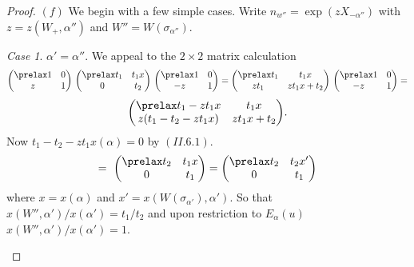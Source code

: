 \documentclass{memo-l}
\theoremstyle{definition}
\theoremstyle{remark}
\newtheorem{case}{Case}
\numberwithin{section}{chapter}
\numberwithin{equation}{chapter}
\begin{document}
\begin{proof}
   $(f)$ We begin with a few simple cases.  Write $n_{w''}  = 
\exp(zX_{-{\alpha}''})$ with $z = z(W_{+},{\alpha''})$ and $W''  = 
W({\sigma}_{{\alpha''}})$.
 

\begin{case} %
${\alpha}' = {\alpha''}$.  We appeal to the $2\times 2$ matrix
calculation
$$
{\begin{pmatrix} \prelax  1 & 0 \\ z & 1 \end{pmatrix}}\
{\begin{pmatrix} \prelax  
 t_1 & t_1x \\ 0 & t_2 \end{pmatrix}}\
{\begin{pmatrix} \prelax  
 1 & 0 \\ -z & 1 \end{pmatrix}}
=
{\begin{pmatrix} \prelax  
 t_1 & t_1x \\ zt_1 & zt_1x+t_2 \end{pmatrix}}\
{\begin{pmatrix} \prelax  
 1 & 0 \\ -z & 1 \end{pmatrix}} =
$$
$$
{\begin{pmatrix} \prelax  
 t_1-zt_1x & t_1x \\
z(t_1-t_2-zt_1x) & zt_1x+t_2 \end{pmatrix}} .
$$
Now $t_{1}-t_{2}-zt_{1}x({\alpha})  =  0$ by $(II.6.1)$.
$$
=\ {\begin{pmatrix} \prelax  
t_2 & t_1x \\ 0 & t_1 \end{pmatrix}} = 
{\begin{pmatrix} \prelax  
t_2 & t_2x' \\ 0 & t_1 \end{pmatrix}}
$$
where $x = x({\alpha})$ and $x'  = 
x(W({\sigma}_{{\alpha}'}),{\alpha}')$.  So that
$x(W'',{\alpha}')/x({\alpha}')  =  t_{1}/t_{2}$ and upon restriction to
$E_{{\alpha}}(u)$ $x(W'',{\alpha}')/x({\alpha}')  =  1$.
\end{case}


\end{proof}
\end{document}
